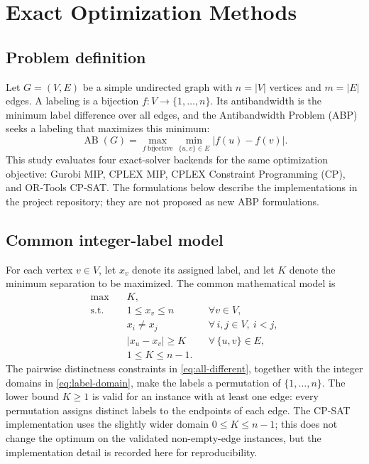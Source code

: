 \section{Exact Optimization Methods}
\label{sec:exact-methods}

\subsection{Problem definition}
Let $G=(V,E)$ be a simple undirected graph with $n=|V|$ vertices and $m=|E|$ edges. A labeling is a bijection $f:V\rightarrow\{1,\ldots,n\}$. Its antibandwidth is the minimum label difference over all edges, and the Antibandwidth Problem (ABP) seeks a labeling that maximizes this minimum:
\begin{equation}
  \operatorname{AB}(G)
  = \max_{f\ \mathrm{bijective}}
    \min_{\{u,v\}\in E}|f(u)-f(v)|.
  \label{eq:abp-objective}
\end{equation}
This study evaluates four exact-solver backends for the same optimization objective: Gurobi MIP, CPLEX MIP, CPLEX Constraint Programming (CP), and OR-Tools CP-SAT. The formulations below describe the implementations in the project repository; they are not proposed as new ABP formulations.

\subsection{Common integer-label model}
For each vertex $v\in V$, let $x_v$ denote its assigned label, and let $K$ denote the minimum separation to be maximized. The common mathematical model is
\begin{align}
  \max\quad & K, \label{eq:exact-obj}\\
  \text{s.t.}\quad
    & 1\le x_v\le n && \forall v\in V, \label{eq:label-domain}\\
    & x_i\ne x_j && \forall\, i,j\in V,\ i<j, \label{eq:all-different}\\
    & |x_u-x_v|\ge K && \forall\,\{u,v\}\in E, \label{eq:edge-distance}\\
    & 1\le K\le n-1. \label{eq:k-domain}
\end{align}
The pairwise distinctness constraints in \eqref{eq:all-different}, together with the integer domains in \eqref{eq:label-domain}, make the labels a permutation of $\{1,\ldots,n\}$. The lower bound $K\ge 1$ is valid for an instance with at least one edge: every permutation assigns distinct labels to the endpoints of each edge. The CP-SAT implementation uses the slightly wider domain $0\le K\le n-1$; this does not change the optimum on the validated non-empty-edge instances, but the implementation detail is recorded here for reproducibility.

